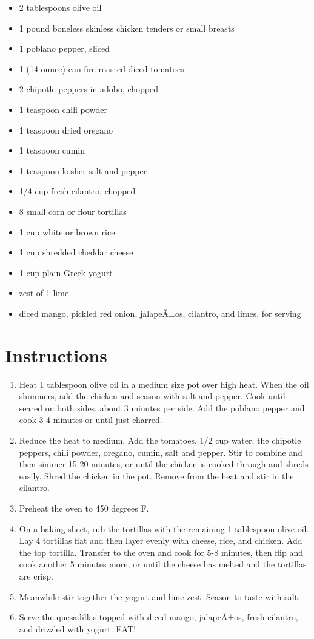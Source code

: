 \documentclass[
  letterpaper,
  DIV=11,
  numbers=noendperiod,
  titlepage=false]{scrreprt}
\providecommand{\tightlist}{%
  \setlength{\itemsep}{0pt}\setlength{\parskip}{0pt}}\usepackage{longtable,booktabs,array}
\begin{document}
\begin{itemize}
\tightlist
\item
  2 tablespoons olive oil
\item
  1 pound boneless skinless chicken tenders or small breasts
\item
  1 poblano pepper, sliced
\item
  1 (14 ounce) can fire roasted diced tomatoes
\item
  2 chipotle peppers in adobo, chopped
\item
  1 teaspoon chili powder
\item
  1 teaspoon dried oregano
\item
  1 teaspoon cumin
\item
  1 teaspoon kosher salt and pepper
\item
  1/4 cup fresh cilantro, chopped
\item
  8 small corn or flour tortillas
\item
  1 cup white or brown rice
\item
  1 cup shredded cheddar cheese
\item
  1 cup plain Greek yogurt
\item
  zest of 1 lime
\item
  diced mango, pickled red onion, jalapeÃ±os, cilantro, and limes, for
  serving
\end{itemize}

\section{Instructions}\label{instructions-120}

\begin{enumerate}
\def\labelenumi{\arabic{enumi}.}
\tightlist
\item
  Heat 1 tablespoon olive oil in a medium size pot over high heat. When
  the oil shimmers, add the chicken and season with salt and pepper.
  Cook until seared on both sides, about 3 minutes per side. Add the
  poblano pepper and cook 3-4 minutes or until just charred.
\item
  Reduce the heat to medium. Add the tomatoes, 1/2 cup water, the
  chipotle peppers, chili powder, oregano, cumin, salt and pepper. Stir
  to combine and then simmer 15-20 minutes, or until the chicken is
  cooked through and shreds easily. Shred the chicken in the pot. Remove
  from the heat and stir in the cilantro.
\item
  Preheat the oven to 450 degrees F.
\item
  On a baking sheet, rub the tortillas with the remaining 1 tablespoon
  olive oil. Lay 4 tortillas flat and then layer evenly with cheese,
  rice, and chicken. Add the top tortilla. Transfer to the oven and cook
  for 5-8 minutes, then flip and cook another 5 minutes more, or until
  the cheese has melted and the tortillas are crisp.
\item
  Meanwhile stir together the yogurt and lime zest. Season to taste with
  salt.
\item
  Serve the quesadillas topped with diced mango, jalapeÃ±os, fresh
  cilantro, and drizzled with yogurt. EAT!
\end{enumerate}
\end{document}
